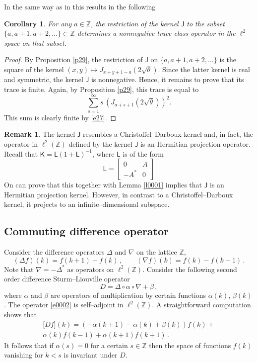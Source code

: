 \documentclass[12pt]{amsart}
\newcommand{\al}{\alpha}
\newcommand{\be}{\beta}
\newcommand{\J}{\mathsf{J}}
\newcommand{\Z}{\mathbb{Z}}
\newcommand{\KK}{\mathsf{K}}
\newcommand{\LL}{\mathsf{L}}
\newcommand{\De}{\Delta}
\newcommand{\ix}{\theta}
\theoremstyle{plain}
\newtheorem{corollary}[lemma]{Corollary}
\theoremstyle{definition}
\newtheorem{remark}[lemma]{Remark}
\numberwithin{equation}{section}
\begin{document}
In the same way as in \cite{TW} this results in  the following 

\begin{corollary}\label{c210} For any
$a\in\Z$, the restriction of the 
kernel $\J$ to the subset $\{a,a+1,a+2,\dots\}\subset\Z$
determines a nonnegative trace class operator in the $\ell^2$
space on that subset.
\end{corollary}

\begin{proof} By Proposition \ref{p29}, the restriction of $\J$ on
$\{a,a+1,a+2,\dots\}$ is the square of the kernel 
$(x,y)\mapsto J_{x+y+1-a}(2\sqrt\ix)$. Since the latter kernel is
real and symmetric, the kernel  $\J$ is nonnegative.
Hence, it remains to prove that its trace is finite. Again, by
Proposition \ref{p29}, this trace is equal to 
%
\begin{equation*}
\sum_{s=1}^\infty s \, (J_{a+s+1}(2\sqrt\ix))^2.
\end{equation*}
%
This sum is clearly finite by \eqref{e27}. 
\end{proof}

\begin{remark}
The kernel $\J$ resembles
a Christoffel--Darboux kernel and, in fact, 
the operator in $\ell^2(\Z)$ defined by the
kernel $\J$ is an Hermitian projection operator.
Recall that $\KK=\LL(1+\LL)^{-1}$, where $\LL$ 
is of the form
$$
\LL=\begin{bmatrix} 0 & A \\ -A^* & 0 
\end{bmatrix}
$$
On can prove that this together with Lemma \ref{l0001} implies
that  $\J$ is an Hermitian projection kernel.
However, in contrast to a Christoffel--Darboux kernel, it
 projects to an infinite--dimensional subspace. 
\end{remark}

\subsection{Commuting difference operator}

Consider the difference operators $\De$ and $\nabla$ on the lattice $\Z$,
$$
(\De f)(k)=f(k+1)-f(k)\,, \qquad (\nabla f)(k)=f(k)-f(k-1)\,. 
$$
Note that $\nabla=-\De^*$ as operators on $\ell^2(\Z)$. Consider the following
 second order difference
Sturm--Liouville operator 
%
\begin{equation}\label{e0002}
D=\De\circ\al\circ\nabla +\be\,,
\end{equation}
%  
where $\al$ and $\be$ are operators of multiplication by certain
functions $\al(k)$, $\be(k)$. The operator \eqref{e0002} is
self--adjoint in $\ell^2(\Z)$. A straightforward computation shows that
%
\begin{multline}\label{e0003}
\big[D f\big](k)=(-\al(k+1)-\al(k)+\be(k))f(k)+\\
\al(k)f(k-1)+\al(k+1)f(k+1)\,.  
\end{multline}
%
It follows that if $\al(s)=0$ for a certain $s\in\Z$ then the space
of functions $f(k)$ vanishing for $k<s$ is invariant under $D$. 
\end{document}
